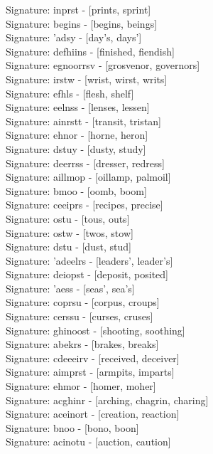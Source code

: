Signature: {inprst} - [prints, sprint] \\
Signature: {begins} - [begins, beings] \\
Signature: {'adsy} - [day's, days'] \\
Signature: {defhiins} - [finished, fiendish] \\
Signature: {egnoorrsv} - [grosvenor, governors] \\
Signature: {irstw} - [wrist, wirst, writs] \\
Signature: {efhls} - [flesh, shelf] \\
Signature: {eelnss} - [lenses, lessen] \\
Signature: {ainrstt} - [transit, tristan] \\
Signature: {ehnor} - [horne, heron] \\
Signature: {dstuy} - [dusty, study] \\
Signature: {deerrss} - [dresser, redress] \\
Signature: {aillmop} - [oillamp, palmoil] \\
Signature: {bmoo} - [oomb, boom] \\
Signature: {ceeiprs} - [recipes, precise] \\
Signature: {ostu} - [tous, outs] \\
Signature: {ostw} - [twos, stow] \\
Signature: {dstu} - [dust, stud] \\
Signature: {'adeelrs} - [leaders', leader's] \\
Signature: {deiopst} - [deposit, posited] \\
Signature: {'aess} - [seas', sea's] \\
Signature: {coprsu} - [corpus, croups] \\
Signature: {cerssu} - [curses, cruses] \\
Signature: {ghinoost} - [shooting, soothing] \\
Signature: {abekrs} - [brakes, breaks] \\
Signature: {cdeeeirv} - [received, deceiver] \\
Signature: {aimprst} - [armpits, imparts] \\
Signature: {ehmor} - [homer, moher] \\
Signature: {acghinr} - [arching, chagrin, charing] \\
Signature: {aceinort} - [creation, reaction] \\
Signature: {bnoo} - [bono, boon] \\
Signature: {acinotu} - [auction, caution] \\
